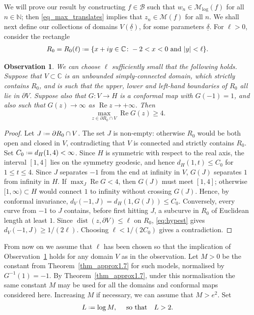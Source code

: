 \documentclass[a4paper, 11pt, reqno]{amsart}
\numberwithin{equation}{section}
\theoremstyle{plain}
\newcommand*{\defeq}{\mathrel{\vcenter{\baselineskip0.5ex \lineskiplimit0pt
 \hbox{\scriptsize.}\hbox{\scriptsize.}}}=}
\newtheorem{observation}[theorem]{Observation}
\theoremstyle{remark}
\newcommand{\C}{{\mathbb{C}}}
\newcommand{\N}{{\mathbb{N}}}
\newcommand{\M}{{\mathcal{M}}}
\newcommand{\Mlog}{{\mathcal{M}_{\log}}}
\newcommand{\uldelta}{\underline{\delta}}
\newcommand{\Rea}{\operatorname{Re }}
\newcommand{\dist}{\operatorname{dist}}
\begin{document}
We will prove our result by constructing $f\in\mathcal B$ such that $w_n\in \Mlog(f)$ for all $n\in\N$; then \eqref{eq_max_translates} implies that $z_n\in\M(f)$ for all $n$. We shall next define our collections of domains $V(\uldelta)$, for some parameters $\uldelta$. 
For $\ell > 0$, consider the rectangle
\begin{align*}
	R_0 = R_0(\ell) \defeq \{ x + iy \in \C \colon -2 < x < 0 \text{ and } |y| < \ell \}.
\end{align*}

\begin{observation}
	\label{claim:ell}
	We can choose $\ell$ sufficiently small that the following holds. Suppose that $V \subset \C$ is an unbounded simply-connected domain, which strictly contains $R_0$, and is such that the upper, lower and left-hand boundaries of $R_0$ all lie in $\partial V$. Suppose also that $G \colon V \to H$ is a conformal map with $G(-1) = 1$, and also such that $G(z) \rightarrow \infty$ as $\Rea z \rightarrow +\infty$. Then 
	\[
	\max_{z \in \partial R_0 \cap V} \Rea G(z) \geq 4. 
	\]
\end{observation}
\begin{proof}
	Let \(J\defeq\partial R_0\cap V\). The set \(J\) is non-empty: otherwise \(R_0\) would be both open and closed in \(V\), contradicting that \(V\) is connected and strictly contains \(R_0\). Set \(C_0\defeq d_H(1,4)<\infty\). Since \(H\) is symmetric with respect to the real axis, the interval \([1,4]\) lies on the symmetry geodesic, and hence \(d_H(1,t)\le C_0\) for \(1\le t\le4\). Since \(J\) separates \(-1\) from the end at infinity in \(V\), \(G(J)\) separates \(1\) from infinity in \(H\). If \(\max_J\Rea G<4\), then \(G(J)\) must meet \([1,4]\); otherwise \([1,\infty)\subset H\) would connect \(1\) to infinity without crossing \(G(J)\). Hence, by conformal invariance, \(d_V(-1,J)=d_H(1,G(J))\le C_0\). Conversely, every curve from \(-1\) to \(J\) contains, before first hitting \(J\), a subcurve in \(R_0\) of Euclidean length at least \(1\). Since \(\dist(z,\partial V)\le\ell\) on \(R_0\), \eqref{eq:hypest} gives \(d_V(-1,J)\ge 1/(2\ell)\). Choosing \(\ell<1/(2C_0)\) gives a contradiction.
\end{proof}


From now on we assume that \(\ell\) has been chosen so that the implication of Observation~\ref{claim:ell} holds for any domain \(V\) as in the observation. Let \(M>0\) be the constant from Theorem~\ref{thm_approx1.7} for such models, normalised by \(G^{-1}(1)=-1\). By Theorem~\ref{thm_approx1.7}, under this normalisation the same constant \(M\) may be used for all the domains and conformal maps considered here. Increasing \(M\) if necessary, we can assume that \(M>e^2\). Set
\begin{equation}\label{eq_L}
	L\defeq \log M, \quad \text{ so that} \quad L>2.
\end{equation}
\end{document}
